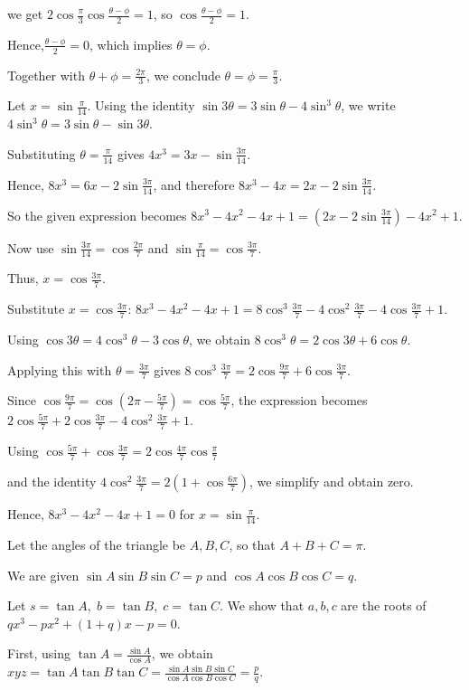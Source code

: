   we get $2\cos\frac\pi3\cos\frac{\theta-\phi}{2}=1$, so
  $\cos\frac{\theta-\phi}{2}=1$.

  Hence,$\frac{\theta-\phi}{2}=0$,
  which implies $\theta=\phi$.

  Together with $\theta+\phi=\frac{2\pi}{3}$, we conclude
  $\theta=\phi=\frac\pi3$.
\item Let $x=\sin\frac\pi{14}$. Using the identity $\sin3\theta=3\sin\theta-4\sin^3\theta$, we write
  $4\sin^3\theta=3\sin\theta-\sin3\theta$.

  Substituting $\theta=\frac\pi{14}$ gives $4x^3=3x-\sin\frac{3\pi}{14}$.

  Hence, $8x^3=6x-2\sin\frac{3\pi}{14}$, and therefore $8x^3-4x =2x-2\sin\frac{3\pi}{14}$.

  So the given expression becomes
  $8x^3-4x^2-4x+1 = (2x-2\sin\frac{3\pi}{14})-4x^2+1$.

  Now use $\sin\frac{3\pi}{14}=\cos\frac{2\pi}{7}$ and
  $\sin\frac\pi{14}=\cos\frac{3\pi}{7}$.

  Thus, $x=\cos\frac{3\pi}{7}$.

  Substitute $x=\cos\frac{3\pi}{7}$: $8x^3-4x^2-4x+1 = 8\cos^3\frac{3\pi}{7}-4\cos^2\frac{3\pi}{7}
  - 4\cos\frac{3\pi}{7}+1$.

  Using $\cos3\theta=4\cos^3\theta-3\cos\theta$, we obtain
  $8\cos^3\theta=2\cos3\theta+6\cos\theta$.

  Applying this with $\theta=\frac{3\pi}{7}$ gives $8\cos^3\frac{3\pi}{7} =
  2\cos\frac{9\pi}{7}+6\cos\frac{3\pi}{7}$.

  Since $\cos\frac{9\pi}{7}=\cos\left(2\pi-\frac{5\pi}{7}\right)=\cos\frac{5\pi}{7}$,
  the expression becomes
  $2\cos\frac{5\pi}{7}+2\cos\frac{3\pi}{7}-4\cos^2\frac{3\pi}{7}+1$.

  Using $\cos\frac{5\pi}{7}+\cos\frac{3\pi}{7}=2\cos\frac{4\pi}{7}\cos\frac\pi7$

  and the identity
  $4\cos^2\frac{3\pi}{7}=2(1+\cos\frac{6\pi}{7})$,
  we simplify and obtain zero.

  Hence,
  $8x^3-4x^2-4x+1=0$ for $x=\sin\frac\pi{14}$.
\item Let the angles of the triangle be $A,B,C$, so that $A+B+C=\pi$.

  We are given $\sin A\sin B\sin C=p$ and $\cos A\cos B\cos C=q$.

  Let $s=\tan A,\; b=\tan B,\; c=\tan C$. We show that $a,b,c$ are the roots of
  $qx^3-px^2+(1+q)x-p=0$.

  First, using $\tan A=\frac{\sin A}{\cos A}$, we obtain
  $xyz=\tan A\tan B\tan C
  =\frac{\sin A\sin B\sin C}{\cos A\cos B\cos C}
  =\frac{p}{q}$.

